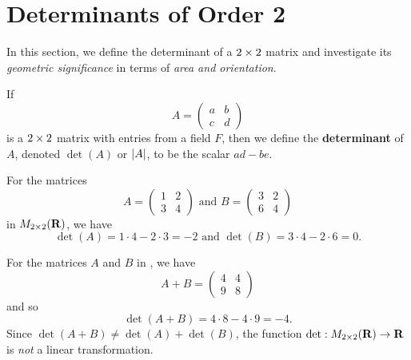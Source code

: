 \section{Determinants of Order 2} \label{sec 4.1}

In this section, we define the determinant of a \(2 \times 2\) matrix and investigate its \emph{geometric significance} in terms of \emph{area and orientation}.

\begin{definition} \label{def 4.1}
If
\[
    A = \begin{pmatrix} a & b \\ c & d \end{pmatrix}
\]
is a \(2 \times 2\) matrix with entries from a field \(F\), then we define the \textbf{determinant} of \(A\), denoted \(\det(A)\) or \(\lvert A\rvert\), to be the scalar \(ad - be\).
\end{definition}

\begin{example} \label{example 4.1.1}
For the matrices
\[
    A = \left(\begin{array}{ll} 1 & 2 \\ 3 & 4 \end{array}\right)
    \text{ and }
    B = \left(\begin{array}{ll} 3 & 2 \\ 6 & 4 \end{array}\right)
\]
in \(M_{2 \times 2}(\mathbf{R})\), we have
\[
    \det(A) = 1 \cdot 4 - 2 \cdot 3 = -2
    \text{ and }
    \det(B) = 3 \cdot 4 - 2 \cdot 6 = 0.
\]
\end{example}

\begin{remark} \label{remark 4.1.1}
For the matrices \(A\) and \(B\) in , we have
\[
  A + B = \left(\begin{array}{ll} 4 & 4 \\ 9 & 8 \end{array}\right)
\]
and so
\[
    \det(A + B) = 4 \cdot 8 - 4 \cdot 9 = -4.
\]
Since \(\det(A + B) \ne \det(A) + \det(B)\), the function \(\det: M_{2 \times 2}(\mathbf{R}) \to \mathbf{R}\) is \emph{not} a linear transformation.
\end{remark}

